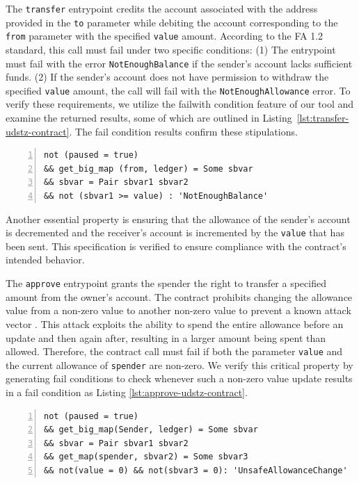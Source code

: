 \documentclass[runningheads]{llncs}
\begin{document}
The \lstinline/transfer/ entrypoint credits the account associated with the address provided in the \lstinline/to/ parameter while debiting the account corresponding to the \lstinline/from/ parameter with the specified \lstinline/value/ amount. According to the FA 1.2 standard, this call must fail under two specific conditions: (1) The entrypoint must fail with the error \lstinline/NotEnoughBalance/ if the sender's account lacks sufficient funds. (2) If the sender's account does not have permission to withdraw the specified \lstinline/value/ amount, the call will fail with the \lstinline/NotEnoughAllowance/ error. To verify these requirements, we utilize the failwith condition feature of our tool and examine the returned results, some of which are outlined in Listing~\ref{lst:transfer-udstz-contract}. The fail condition results confirm these stipulations.
\begin{lstlisting}[float,captionpos=b,caption={The not enough balance fail condition for the \lstinline/transfer/ entrypoint},label={lst:transfer-udstz-contract},numbers=left]
not (paused = true) 
&& get_big_map (from, ledger) = Some sbvar 
&& sbvar = Pair sbvar1 sbvar2 
&& not (sbvar1 >= value) : 'NotEnoughBalance'
\end{lstlisting}
Another essential property is ensuring that the allowance of the sender's account is decremented and the receiver's account is incremented by the \lstinline/value/ that has been sent. This specification is verified to ensure compliance with the contract's intended behavior.

The \texttt{approve} entrypoint grants the spender the right to transfer a specified amount from the owner's account. The contract prohibits changing the allowance value from a non-zero value to another non-zero value to prevent a known attack vector \cite{attack-vector}. This attack exploits the ability to spend the entire allowance before an update and then again after, resulting in a larger amount being spent than allowed. Therefore, the contract call must fail if both the parameter \lstinline/value/ and the current allowance of \lstinline/spender/ are non-zero. We verify this critical property by generating fail conditions to check whenever such a non-zero value update results in a fail condition as Listing \ref{lst:approve-udstz-contract}.
\begin{lstlisting}[float=tp,captionpos=b,caption={The non-zero value fail condition for the \lstinline/approve/ entrypoint},label={lst:approve-udstz-contract},numbers=left]
not (paused = true) 
&& get_big_map(Sender, ledger) = Some sbvar 
&& sbvar = Pair sbvar1 sbvar2 
&& get_map(spender, sbvar2) = Some sbvar3 
&& not(value = 0) && not(sbvar3 = 0): 'UnsafeAllowanceChange'
\end{lstlisting}
\end{document}
